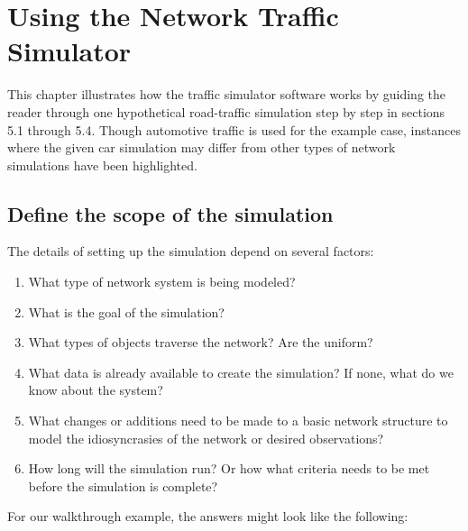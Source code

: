 \chapter{Using the Network Traffic Simulator}
\label{Manual}

\par This chapter illustrates how the traffic simulator software works by guiding the reader through one hypothetical road-traffic simulation step by step in sections 5.1 through 5.4.  Though automotive traffic is used for the example case, instances where the given car simulation may differ from other types of network simulations have been highlighted. \\

\section{Define the scope of the simulation}

\par The details of setting up the simulation depend on several factors:

\begin{enumerate}
    \item What type of network system is being modeled?
    \item What is the goal of the simulation? 
    \item What types of objects traverse the network?  Are the uniform?
    \item What data is already available to create the simulation?  If none, what do we know about the system?
    \item What changes or additions need to be made to a basic network structure to model the idiosyncrasies of the network or desired observations?
    \item How long will the simulation run?  Or how what criteria needs to be met before the simulation is complete?
\end{enumerate}

\noindent For our walkthrough example, the answers might look like the following:

